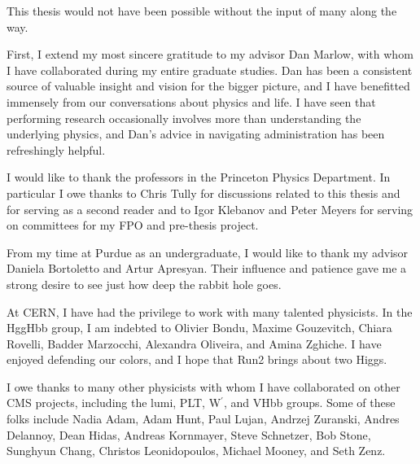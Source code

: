 This thesis would not have been possible without the input of many along the way.

First, I extend my most sincere gratitude to my advisor Dan Marlow, with whom I have collaborated
during my entire graduate studies.
Dan has been a consistent source of valuable insight and vision for the bigger picture, and
I have benefitted immensely from our conversations about physics and life.
I have seen that performing research occasionally involves
more than understanding the underlying physics,
and Dan's advice in navigating administration has been refreshingly helpful.

I would like to thank the professors in the Princeton Physics Department. In particular
I owe thanks to Chris Tully for discussions related to this thesis and for serving as a second reader
and to Igor Klebanov and Peter Meyers for serving on committees for my FPO and pre-thesis project.

From my time at Purdue as an undergraduate, I would like to thank my advisor Daniela Bortoletto and
Artur Apresyan. Their influence and patience gave me a strong desire to
see just how deep the rabbit hole goes.

At CERN, I have had the privilege to work with many talented physicists. In the HggHbb group,
I am indebted to
Olivier Bondu, Maxime Gouzevitch, Chiara Rovelli, Badder Marzocchi, Alexandra Oliveira, and
Amina Zghiche. I have enjoyed defending our colors,
and I hope that Run2 brings about two Higgs.

I owe thanks to many other physicists with whom I have collaborated on other CMS projects, including the
lumi, PLT, W$^\prime$, and VHbb groups. Some of these folks include
Nadia Adam, Adam Hunt, Paul Lujan, Andrzej Zuranski,
Andres Delannoy, Dean Hidas, Andreas Kornmayer, Steve Schnetzer, Bob Stone, 
Sunghyun Chang, Christos Leonidopoulos, Michael Mooney, and Seth Zenz.

